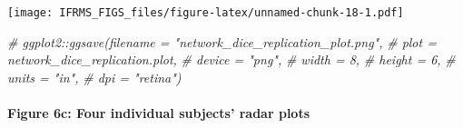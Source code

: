 \documentclass[
]{article}
\newenvironment{Shaded}{\begin{snugshade}}{\end{snugshade}}
\newcommand{\CommentTok}[1]{\textcolor[rgb]{0.56,0.35,0.01}{\textit{#1}}}
\begin{document}
\texttt{[image: IFRMS\_FIGS\_files/figure-latex/unnamed-chunk-18-1.pdf]}

\begin{Shaded}
\begin{Highlighting}[]
\CommentTok{# ggplot2::ggsave(filename = "network_dice_replication_plot.png",}
\CommentTok{#                 plot = network_dice_replication.plot,}
\CommentTok{#                 device = "png",}
\CommentTok{#                 width = 8,}
\CommentTok{#                 height = 6, }
\CommentTok{#                 units = "in",}
\CommentTok{#                 dpi = "retina")}
\end{Highlighting}
\end{Shaded}

\hypertarget{figure-6c-four-individual-subjects-radar-plots}{%
\paragraph{Figure 6c: Four individual subjects' radar
plots}\label{figure-6c-four-individual-subjects-radar-plots}}
\end{document}
